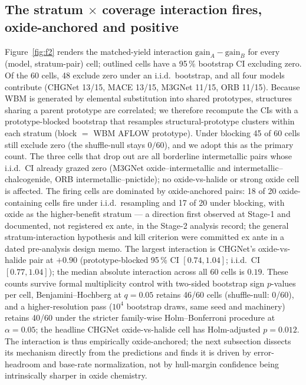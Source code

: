 \documentclass[aip,jcp,preprint,superscriptaddress,amsmath,amssymb]{revtex4-2}
\begin{document}
\subsection{The stratum $\times$ coverage interaction fires, oxide-anchored and positive}

Figure~\ref{fig:f2} renders the matched-yield interaction $\mathrm{gain}_A - \mathrm{gain}_B$
for every (model, stratum-pair) cell; outlined cells have a 95\,\% bootstrap CI excluding
zero. Of the 60 cells, 48 exclude zero under an i.i.d.\ bootstrap, and all four models
contribute (CHGNet 13/15, MACE 13/15, M3GNet 11/15, ORB 11/15). Because WBM is generated by
elemental substitution into shared prototypes, structures sharing a parent prototype are
correlated; we therefore recompute the CIs with a prototype-blocked bootstrap that
resamples structural-prototype clusters within each stratum (block $=$ WBM AFLOW
prototype). Under blocking 45 of 60 cells still exclude zero (the shuffle-null stays
$0/60$), and we adopt this as the primary count. The three cells that drop out are all
borderline intermetallic pairs whose i.i.d.\ CI already grazed zero (M3GNet
oxide--intermetallic and intermetallic--chalcogenide, ORB intermetallic--pnictide); no
oxide-vs-halide or strong oxide cell is affected. The firing cells are dominated by
oxide-anchored pairs: 18 of 20 oxide-containing cells fire under i.i.d.\ resampling and 17 of
20 under blocking, with oxide as the higher-benefit stratum --- a direction first observed at
Stage-1 and documented, not registered ex ante, in
the Stage-2 analysis record; the general
stratum-interaction hypothesis and kill criterion were committed ex ante in
a dated pre-analysis design memo. The largest interaction is CHGNet's
oxide-vs-halide pair at $+0.90$ (prototype-blocked 95\,\% CI $[0.74, 1.04]$; i.i.d.\ CI
$[0.77, 1.04]$); the median absolute interaction across all 60 cells is $0.19$. These counts
survive formal multiplicity control
with two-sided bootstrap sign
$p$-values per cell, Benjamini--Hochberg at $q=0.05$ retains 46/60 cells (shuffle-null:
0/60), and a higher-resolution pass ($10^4$ bootstrap draws, same seed and machinery)
retains 40/60 under the stricter family-wise Holm--Bonferroni procedure at
$\alpha = 0.05$; the headline CHGNet oxide-vs-halide cell has Holm-adjusted
$p = 0.012$. The interaction is thus empirically oxide-anchored; the next subsection dissects
its mechanism directly from the predictions and finds it is driven by error-headroom and
base-rate normalization, not by hull-margin confidence being intrinsically sharper in oxide
chemistry.
\end{document}
